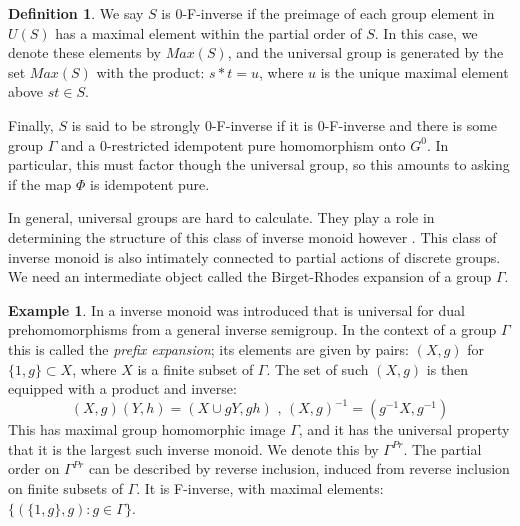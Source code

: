\documentclass[11pt,a4paper]{amsart}
\theoremstyle{plain}
\theoremstyle{definition}%
\newtheorem{definition}[theorem]{Definition}%
\newtheorem{example}[theorem]{Example}%
\theoremstyle{remark}%
\begin{document}
\begin{definition}
We say $S$ is 0-F-inverse if the preimage of each group element in $U(S)$ has a maximal element within the partial order of $S$. In this case, we denote these elements by $Max(S)$, and the universal group is generated by the set $Max(S)$ with the product: $s\ast t = u$, where $u$ is the unique maximal element above $st \in S$. 

Finally, $S$ is said to be strongly $0$-F-inverse if it is $0$-F-inverse and there is some group $\Gamma$ and a $0$-restricted idempotent pure homomorphism onto $G^{0}$. In particular, this must factor though the universal group, so this amounts to asking if the map $\Phi$ is idempotent pure.
\end{definition}

In general, universal groups are hard to calculate. They play a role in determining the structure of this class of inverse monoid however \cite{}. This class of inverse monoid is also intimately connected to partial actions of discrete groups. We need an intermediate object called the Birget-Rhodes expansion of a group $\Gamma$.

\begin{example}
In \cite{MR745358,MR2221438} a inverse monoid was introduced that is universal for dual prehomomorphisms from a general inverse semigroup. In the context of a group $\Gamma$ this is called the \textit{prefix expansion}; its elements are given by pairs: $(X,g)$ for $\lbrace 1,g\rbrace \subset X$, where $X$ is a finite subset of $\Gamma$. The set of such $(X,g)$ is then equipped with a product and inverse:
\begin{equation*}
(X,g)(Y,h) = (X\cup gY,gh)\mbox{ , } (X,g)^{-1}=(g^{-1}X,g^{-1})
\end{equation*}
This has maximal group homomorphic image $\Gamma$, and it has the universal property that it is the largest such inverse monoid. We denote this by $\Gamma^{Pr}$. The partial order on $\Gamma^{Pr}$ can be described by reverse inclusion, induced from reverse inclusion on finite subsets of $\Gamma$. It is F-inverse, with maximal elements: $\lbrace(\lbrace 1,g \rbrace, g):g \in \Gamma \rbrace$.
\end{example}
\end{document}
